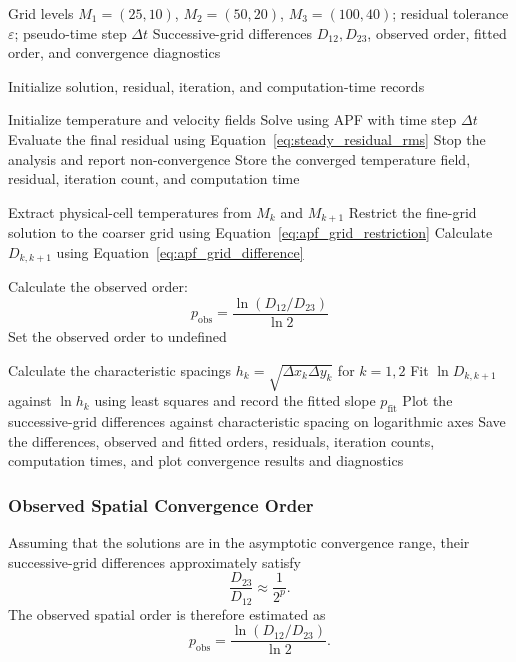\begin{algorithm}[H]
\caption{APF Grid Self-Convergence Analysis}
\label{alg:apf_grid_self_convergence}
\begin{algorithmic}[1]
\Require Grid levels $M_1=(25,10)$, $M_2=(50,20)$,
$M_3=(100,40)$; residual tolerance $\varepsilon$;
pseudo-time step $\Delta t$
\Ensure Successive-grid differences $D_{12},D_{23}$,
observed order, fitted order, and convergence diagnostics

\State Initialize solution, residual, iteration, and
computation-time records

    \State Initialize temperature and velocity fields
    \State Solve using APF with time step $\Delta t$
    \State Evaluate the final residual using
    Equation~\eqref{eq:steady_residual_rms}
        \State Stop the analysis and report non-convergence
    \EndIf
    \State Store the converged temperature field,
    residual, iteration count, and computation time
\EndFor

    \State Extract physical-cell temperatures from $M_k$
    and $M_{k+1}$
    \State Restrict the fine-grid solution to the coarser
    grid using Equation~\eqref{eq:apf_grid_restriction}
    \State Calculate $D_{k,k+1}$ using
    Equation~\eqref{eq:apf_grid_difference}
\EndFor

    \State Calculate the observed order:
    \[
    p_{\mathrm{obs}}
    =
    \frac{\ln(D_{12}/D_{23})}{\ln 2}
    \]
\Else
    \State Set the observed order to undefined
\EndIf

\State Calculate the characteristic spacings
$h_k=\sqrt{\Delta x_k\Delta y_k}$ for $k=1,2$
\State Fit $\ln D_{k,k+1}$ against $\ln h_k$
using least squares and record the fitted slope $p_{\mathrm{fit}}$
\State Plot the successive-grid differences against
characteristic spacing on logarithmic axes
\State Save the differences, observed and fitted orders,
residuals, iteration counts, computation times, and plot
\State \Return convergence results and diagnostics
\end{algorithmic}
\end{algorithm}

\subsubsection{Observed Spatial Convergence Order}

Assuming that the solutions are in the asymptotic convergence
range, their successive-grid differences approximately satisfy
\begin{equation}
\frac{D_{23}}{D_{12}}\approx \frac{1}{2^p}.
\end{equation}
The observed spatial order is therefore estimated as
\begin{equation}
\boxed{
p_{\mathrm{obs}}
=
\frac{\ln(D_{12}/D_{23})}{\ln 2}.
}
\label{eq:apf_observed_spatial_order}
\end{equation}

